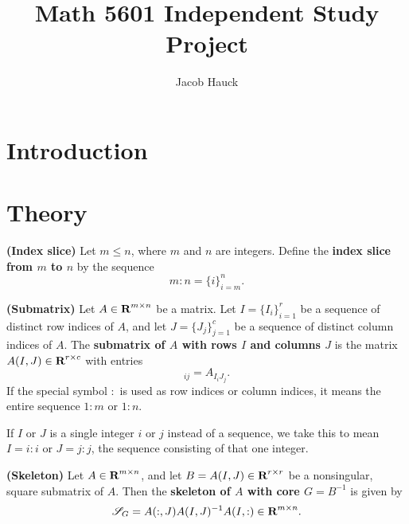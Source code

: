 \documentclass{article}
\author{Jacob Hauck}
\title{Math 5601 Independent Study Project}
\date{}
\begin{document}
	\maketitle
	
	\section{Introduction}
	
	\section{Theory}
	
	\begin{dfn} \textnormal{\bf(Index slice)}
		\label{def:index_slice}
		Let $m \le n$, where $m$ and $n$ are integers. Define the \textbf{index slice from $m$ to $n$} by the sequence
		\begin{equation}
			m: n = \{i\}_{i=m}^n.
		\end{equation}
	\end{dfn}
	
	\begin{dfn} \textnormal{\bf(Submatrix)}
		\label{def:submatrix}
		Let $A \in \textnormal{\bf R}^{m\times n}$ be a matrix. Let $I = \{I_i\}_{i=1}^r$ be a sequence of distinct row indices of $A$, and let $J = \{J_j\}_{j=1}^c$ be a sequence of distinct column indices of $A$. The \textbf{submatrix of $A$ with rows $I$ and columns $J$} is the matrix $A(I,J) \in \textnormal{\bf R}^{r\times c}$ with entries
		\begin{equation}
			[A(I,J)]_{ij} = A_{I_iJ_j}.
		\end{equation}
		If the special symbol $:$ is used as row indices or column indices, it means the entire sequence $1:m$ or $1:n$.
		
		If $I$ or $J$ is a single integer $i$ or $j$ instead of a sequence, we take this to mean $I = i:i$ or $J = j:j$, the sequence consisting of that one integer.
	\end{dfn}
	
	\begin{dfn} \textnormal{\bf(Skeleton)}
		\label{def:skeleton}
		Let $A \in \textnormal{\bf R}^{m\times n}$, and let $B = A(I,J) \in \textnormal{\bf R}^{r\times r}$ be a nonsingular, square submatrix of $A$. Then the \textbf{skeleton of $A$ with core $G = B^{-1}$} is given by
		\begin{equation}
			\mathscr{S}_{G} = A(:,J)A(I,J)^{-1}A(I,:) \in \textnormal{\bf R}^{m\times n}.
		\end{equation}
	\end{dfn}
	
\end{document}
